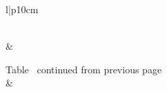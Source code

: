 \small{
\begin{longtable}{l|p{10cm}}
    \caption{Function descriptions used in prompts.}\label{tab: function descriptions}\\
    
    \toprule
     &  \\ 
    \midrule
    \endfirsthead
    
    {{Table \thetable\ continued from previous page}} \\
    \toprule
     &  \\ 
    \midrule
    \endhead
    
    \midrule
     \\ \bottomrule
    \endfoot
    
    \bottomrule
    \endlastfoot
    

\end{longtable}}
